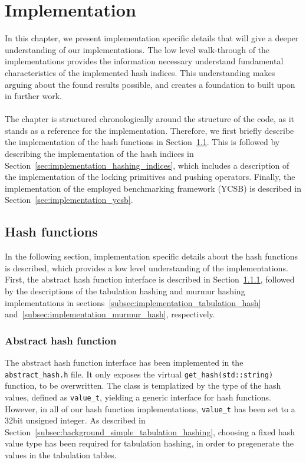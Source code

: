 \documentclass[11pt]{report} %
\begin{document}
\chapter{Implementation}
\label{chap:implementation}
In this chapter, we present implementation specific details that will give a deeper understanding of our implementations. The low level walk-through of the implementations provides the information necessary understand fundamental characteristics of the implemented hash indices. This understanding makes arguing about the found results possible, and creates a foundation to built upon in further work.\\
\\
The chapter is structured chronologically around the structure of the code, as it stands as a reference for the implementation. Therefore, we first briefly describe the implementation of the hash functions in Section~\ref{sec:implementation_hashing_algorithms}. This is followed by describing the implementation of the hash indices in Section~\ref{sec:implementation_hashing_indices}, which includes a description of the implementation of the locking primitives and pushing operators. Finally, the implementation of the employed benchmarking framework (YCSB) is described in Section~\ref{sec:implementation_ycsb}.
\section{Hash functions}
\label{sec:implementation_hashing_algorithms}
In the following section, implementation specific details about the hash functions is described, which provides a low level understanding of the implementations. First, the abstract hash function interface is described in Section~\ref{subsec:implementation_abstract_hash_function}, followed by the descriptions of the tabulation hashing and murmur hashing implementations in sections~\ref{subsec:implementation_tabulation_hash} and~\ref{subsec:implementation_murmur_hash}, respectively.
\subsection{Abstract hash function}
\label{subsec:implementation_abstract_hash_function}
The abstract hash function interface has been implemented in the \verb=abstract_hash.h= file. It only exposes the virtual \verb|get_hash(std::string)| function, to be overwritten. The class is templatized by the type of the hash values, defined as \verb|value_t|, yielding a generic interface for hash functions. However, in all of our hash function implementations, \verb|value_t| has been set to a 32bit unsigned integer. As described in Section~\ref{subsec:background_simple_tabulation_hashing}, choosing a fixed hash value type has been required for tabulation hashing, in order to pregenerate the values in the tabulation tables.
\end{document}
